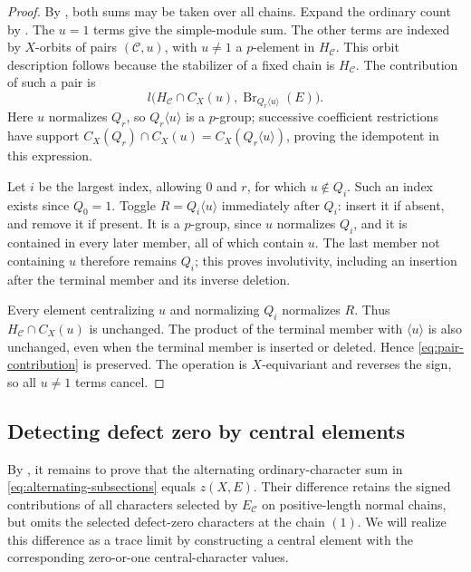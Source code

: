 \begin{proof}
By , both sums may be taken over
all chains. Expand the ordinary count by .
The $u=1$ terms give the simple-module sum. The other terms are
indexed by $X$-orbits of pairs $(\mathcal C,u)$, with $u\ne1$ a
$p$-element in $H_{\mathcal C}$. This orbit description follows
because the stabilizer of a fixed chain is $H_{\mathcal C}$.
The contribution of such a pair is
\begin{equation}\label{eq:pair-contribution}
 l\bigl(H_{\mathcal C}\cap C_X(u),
         \operatorname{Br}_{Q_r\langle u\rangle}(E)\bigr).
\end{equation}
Here $u$ normalizes $Q_r$, so $Q_r\langle u\rangle$ is a
$p$-group; successive coefficient restrictions have support
$C_X(Q_r)\cap C_X(u)=C_X(Q_r\langle u\rangle)$, proving the
idempotent in this expression.

Let $i$ be the largest index, allowing $0$ and $r$, for which
$u\notin Q_i$. Such an index exists since $Q_0=1$. Toggle
$R=Q_i\langle u\rangle$ immediately after $Q_i$: insert it
if absent, and remove it if present. It is a $p$-group, since
$u$ normalizes $Q_i$, and it is contained in every later member,
all of which contain $u$. The last member not containing $u$
therefore remains $Q_i$; this proves involutivity, including an
insertion after the terminal member and its inverse deletion.

Every element centralizing $u$ and normalizing $Q_i$ normalizes
$R$. Thus $H_{\mathcal C}\cap C_X(u)$ is unchanged. The product
of the terminal member with $\langle u\rangle$ is also unchanged,
even when the terminal member is inserted or deleted. Hence
\eqref{eq:pair-contribution} is preserved. The operation is
$X$-equivariant and reverses the sign, so all $u\ne1$ terms cancel.
\end{proof}

\subsection{Detecting defect zero by central elements}

By , it remains to prove that the
alternating ordinary-character sum in
\eqref{eq:alternating-subsections} equals $z(X,E)$. Their difference
retains the signed contributions of all characters selected by
$E_{\mathcal C}$ on positive-length normal chains, but omits the
selected defect-zero characters at the chain $(1)$. We will realize
this difference as a trace limit by constructing a central element
with the corresponding zero-or-one central-character values.

